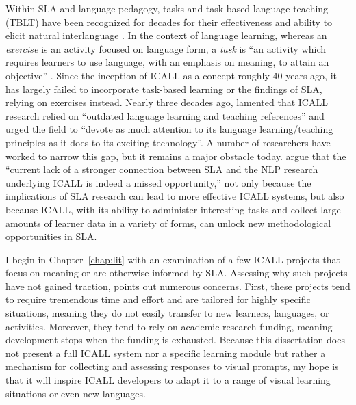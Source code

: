 Within SLA and language pedagogy, tasks and task-based language teaching (TBLT) have been recognized for decades for their effectiveness and ability to elicit natural interlanguage \cite{ellis2003task}. In the context of language learning, whereas an \textit{exercise} is an activity focused on language form, a \textit{task} is ``an activity which requires learners to use language, with an emphasis on meaning, to attain an objective'' \cite{bygate2001researching}. Since the inception of ICALL as a concept roughly 40 years ago, it has largely failed to incorporate task-based learning or the findings of SLA, relying on exercises instead. Nearly three decades ago, \citet{oxford1993intelligent} lamented that ICALL research relied on ``outdated language learning and teaching references'' and urged the field to ``devote as much attention to its language learning/teaching principles as it does to its exciting technology''. A number of researchers have worked to narrow this gap, but it remains a major obstacle today. \citet{ziegler2017interdisciplinary} argue that the ``current lack of a stronger connection between SLA and the NLP research underlying ICALL is indeed a missed opportunity,'' not only because the implications of SLA research can lead to more effective ICALL systems, but also because ICALL, with its ability to administer interesting tasks and collect large amounts of learner data in a variety of forms, can unlock new methodological opportunities in SLA.

I begin in Chapter~\ref{chap:lit} with an examination of a few ICALL projects that focus on meaning or are otherwise informed by SLA. Assessing why such projects have not gained traction, \citet{schulze2010taking} points out numerous concerns. First, these projects tend to require tremendous time and effort and are tailored for highly specific situations, meaning they do not easily transfer to new learners, languages, or activities. Moreover, they tend to rely on academic research funding, meaning development stops when the funding is exhausted. Because this dissertation does not present a full ICALL system nor a specific learning module but rather a mechanism for collecting and assessing responses to visual prompts, my hope is that it will inspire ICALL developers to adapt it to a range of visual learning situations or even new languages.

